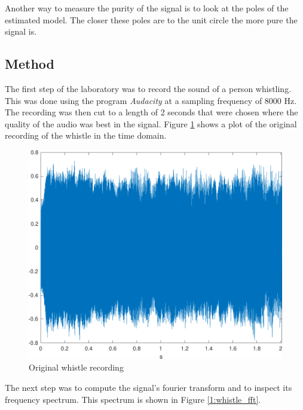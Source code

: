 \documentclass{IEEEtran}
\begin{document}
Another way to measure the purity of the signal is to look at the poles
of the estimated model. The closer these poles are to the unit circle
the more pure the signal is.

\subsection{Method}
\label{sub:whistlemethod}
The first step of the laboratory was to record the sound of a person
whistling. This was done using the program \textit{Audacity}
\cite{audacity} at a sampling frequency of 8000 Hz. The recording was then
cut to a length of 2 seconds that were chosen where the quality of the
audio was best in the signal. Figure \ref{1:whistle_orig} shows a plot
of the original recording of the whistle in the time domain.

\begin{figure}[h]
  \centering
  \captionsetup{justification=centering}

  \includegraphics[width=0.8\columnwidth]{pictures/whistle_orig.pdf}
  \caption{Original whistle recording}
  \label{1:whistle_orig}

\end{figure}

The next step was to compute the signal's fourier transform and to
inspect its frequency spectrum. This spectrum is shown in Figure
\ref{1:whistle_fft}.
\end{document}
